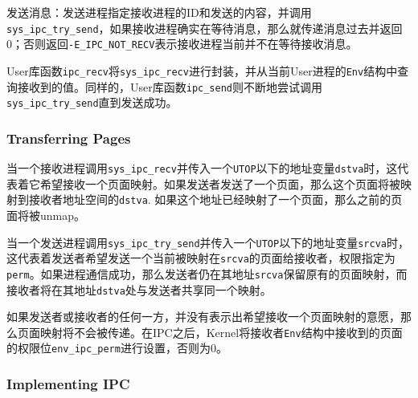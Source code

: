 \documentclass[11pt]{article}
\begin{document}
发送消息：发送进程指定接收进程的ID和发送的内容，并调用\lstinline|sys_ipc_try_send|，如果接收进程确实在等待消息，那么就传递消息过去并返回 0；否则返回\lstinline|-E_IPC_NOT_RECV|表示接收进程当前并不在等待接收消息。 

User库函数\lstinline|ipc_recv|将\lstinline|sys_ipc_recv|进行封装，并从当前User进程的\lstinline|Env|结构中查询接收到的值。同样的，User库函数\lstinline|ipc_send|则不断地尝试调用\lstinline|sys_ipc_try_send|直到发送成功。
 
\subsubsection{Transferring Pages}
当一个接收进程调用\lstinline|sys_ipc_recv|并传入一个\lstinline|UTOP|以下的地址变量\lstinline|dstva|时，这代表着它希望接收一个页面映射。如果发送者发送了一个页面，那么这个页面将被映射到接收者地址空间的\lstinline|dstva|. 如果这个地址已经映射了一个页面，那么之前的页面将被unmap。

当一个发送进程调用\lstinline|sys_ipc_try_send|并传入一个\lstinline|UTOP|以下的地址变量\lstinline|srcva|时，这代表着发送者希望发送一个当前被映射在\lstinline|srcva|的页面给接收者，权限指定为\lstinline|perm|。如果进程通信成功，那么发送者仍在其地址\lstinline|srcva|保留原有的页面映射，而接收者将在其地址\lstinline|dstva|处与发送者共享同一个映射。

如果发送者或接收者的任何一方，并没有表示出希望接收一个页面映射的意愿，那么页面映射将不会被传递。在IPC之后，Kernel将接收者\lstinline|Env|结构中接收到的页面的权限位\lstinline|env_ipc_perm|进行设置，否则为0。

\subsubsection{Implementing IPC}
\end{document}
